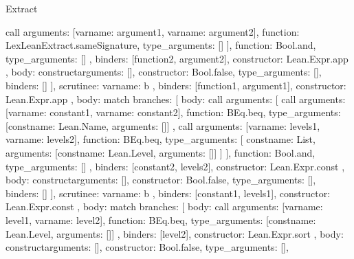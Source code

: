 \begin{lexlean}{Extract}
\begin{toolingmodule}
{{{{{{{                      call{
                        arguments: [var{name: argument1}, var{name: argument2}],
                        function: LexLeanExtract.sameSignature,
                        type_arguments: []
                      }
                    ],
                    function: Bool.and,
                    type_arguments: []
                  },
                  binders: [function2, argument2],
                  constructor: Lean.Expr.app
                },
                {
                  body: construct{arguments: [], constructor: Bool.false, type_arguments: []},
                  binders: []
                }
              ],
              scrutinee: var{name: b}
            },
            binders: [function1, argument1],
            constructor: Lean.Expr.app
          },
          {
            body: match{
              branches: [
                {
                  body: call{
                    arguments: [
                      call{
                        arguments: [var{name: constant1}, var{name: constant2}],
                        function: BEq.beq,
                        type_arguments: [const{name: Lean.Name, arguments: []}]
                      },
                      call{
                        arguments: [var{name: levels1}, var{name: levels2}],
                        function: BEq.beq,
                        type_arguments: [
                          const{name: List, arguments: [const{name: Lean.Level, arguments: []}]}
                        ]
                      }
                    ],
                    function: Bool.and,
                    type_arguments: []
                  },
                  binders: [constant2, levels2],
                  constructor: Lean.Expr.const
                },
                {
                  body: construct{arguments: [], constructor: Bool.false, type_arguments: []},
                  binders: []
                }
              ],
              scrutinee: var{name: b}
            },
            binders: [constant1, levels1],
            constructor: Lean.Expr.const
          },
          {
            body: match{
              branches: [
                {
                  body: call{
                    arguments: [var{name: level1}, var{name: level2}],
                    function: BEq.beq,
                    type_arguments: [const{name: Lean.Level, arguments: []}]
                  },
                  binders: [level2],
                  constructor: Lean.Expr.sort
                },
                {
                  body: construct{arguments: [], constructor: Bool.false, type_arguments: []},
}}}}}}
\end{toolingmodule}
\end{lexlean}

